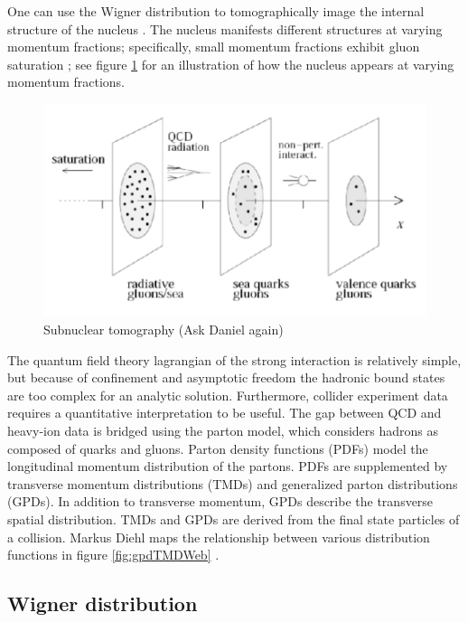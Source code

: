 One can use the Wigner distribution to tomographically image the internal structure of the nucleus \cite{Hatta:2016dxp}. The nucleus manifests different structures at varying momentum fractions; specifically, small momentum fractions exhibit gluon saturation \cite{Boer:2011fh}; see figure \ref{fig:nuclImag} for an illustration of how the nucleus appears at varying momentum fractions.

\begin{figure}[h!]
\begin{centering}
\includegraphics[width=7in]{Chapter1/importfigs/imaging_the_nucleon_upc_dijets_pres.png}
\par\end{centering}
\caption{Subnuclear tomography (Ask Daniel again) \label{fig:nuclImag}}
\end{figure}

The quantum field theory lagrangian of the strong interaction is relatively simple, but because of confinement and asymptotic freedom the hadronic bound states are too complex for an analytic solution. Furthermore, collider experiment data requires a quantitative interpretation to be useful. The gap between QCD and heavy-ion data is bridged using the parton model, which considers hadrons as composed of quarks and gluons. Parton density functions (PDFs) model the longitudinal momentum distribution of the partons. PDFs are supplemented by transverse momentum distributions (TMDs) and generalized parton distributions (GPDs). In addition to transverse momentum, GPDs describe the transverse spatial distribution. TMDs and GPDs are derived from the final state particles of a collision. Markus Diehl maps the relationship between various distribution functions in figure \ref{fig:gpdTMDWeb} \cite{Diehl:2003ny}.

\subsection{Wigner distribution}

